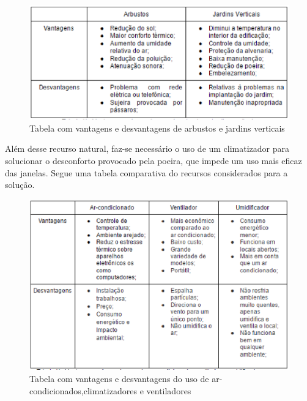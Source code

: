 \begin{figure}[!ht]
  \centering
  \includegraphics[keepaspectratio=true,scale=1]{figuras/tabela_vantagens_e_desvantagens_do_jardim_vertical.eps}
  \caption{Tabela com vantagens e desvantagens de arbustos e jardins verticais}
  \label{fig:comparativo_jartins}
\end{figure}

Além desse recurso natural, faz-se necessário o uso de um climatizador para solucionar o desconforto provocado pela poeira, que impede um uso mais eficaz das janelas. Segue uma tabela comparativa do recursos considerados para a solução.

\begin{figure}[!ht]
  \centering
  \includegraphics[keepaspectratio=true,scale=1]{figuras/tabela_vantagens_e_desvantagens_do_climatizador.eps}
  \caption{Tabela com vantagens e desvantagens do uso de ar-condicionados,climatizadores e ventiladores}
  \label{fig:comparativo_climatizador}
\end{figure}

